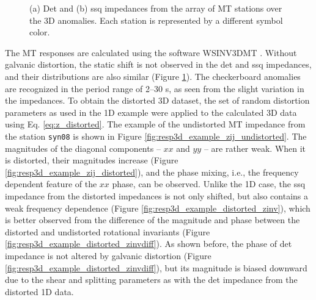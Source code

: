 \begin{figure}[!b]
	\centering
	\caption[Det and ssq impedances from MT array over the checkerboard model]{(a) Det and (b) ssq impedances from the array of MT stations over the 3D anomalies. Each station is represented by a different symbol color.}
	\label{fig:resp3d_individual_all_undistorted}
\end{figure}


The MT responses are calculated using the software WSINV3DMT \citep{siripunvaraporn2005a}.  
%
Without galvanic distortion, the static shift is not observed in the det and ssq impedances, and their distributions are also similar (Figure \ref{fig:resp3d_individual_all_undistorted}). 
%
The checkerboard anomalies are recognized in the period range of 2--30 s, as seen from the slight variation in the impedances. 
%
To obtain the distorted 3D dataset, the set of random distortion parameters as used in the 1D example were applied to the calculated 3D data using Eq. \eqref{eq:z_distorted}. 
%
The example of the undistorted MT impedance from the station \texttt{syn08} is shown in Figure \ref{fig:resp3d_example_zij_undistorted}. The magnitudes of the diagonal components -- $xx$ and $yy$ -- are rather weak.
When it is distorted, their magnitudes increase (Figure \ref{fig:resp3d_example_zij_distorted}), and
 the phase mixing, i.e., the frequency dependent feature of the $xx$ phase, can be observed.
%
Unlike the 1D case, the ssq impedance from the distorted impedances is not only shifted, but also contains a weak frequency dependence (Figure \ref{fig:resp3d_example_distorted_zinv}), which is better observed from the difference of the magnitude and phase between the distorted and undistorted rotational invariants (Figure \ref{fig:resp3d_example_distorted_zinvdiff}).
As shown before, the phase of det impedance is not altered by galvanic distortion (Figure \ref{fig:resp3d_example_distorted_zinvdiff}), but its magnitude is biased downward due to the shear and splitting parameters as with the det impedance from the distorted 1D data.


